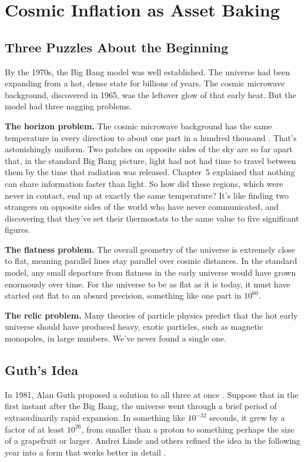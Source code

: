 \section{Cosmic Inflation as Asset Baking}

\subsection{Three Puzzles About the Beginning}

By the 1970s, the Big Bang model was well established. The universe had been expanding from a hot, dense state for billions of years. The cosmic microwave background, discovered in 1965, was the leftover glow of that early heat. But the model had three nagging problems.

\textbf{The horizon problem.} The cosmic microwave background has the same temperature in every direction to about one part in a hundred thousand \cite{smoot1992}. That's astonishingly uniform. Two patches on opposite sides of the sky are so far apart that, in the standard Big Bang picture, light had not had time to travel between them by the time that radiation was released. Chapter~5 explained that nothing can share information faster than light. So how did these regions, which were never in contact, end up at exactly the same temperature? It's like finding two strangers on opposite sides of the world who have never communicated, and discovering that they've set their thermostats to the same value to five significant figures.

\textbf{The flatness problem.} The overall geometry of the universe is extremely close to flat, meaning parallel lines stay parallel over cosmic distances. In the standard model, any small departure from flatness in the early universe would have grown enormously over time. For the universe to be as flat as it is today, it must have started out flat to an absurd precision, something like one part in \(10^{60}\).

\textbf{The relic problem.} Many theories of particle physics predict that the hot early universe should have produced heavy, exotic particles, such as magnetic monopoles, in large numbers. We've never found a single one.

\subsection{Guth's Idea}

In 1981, Alan Guth proposed a solution to all three at once \cite{guth1981}. Suppose that in the first instant after the Big Bang, the universe went through a brief period of extraordinarily rapid expansion. In something like \(10^{-32}\) seconds, it grew by a factor of at least \(10^{26}\), from smaller than a proton to something perhaps the size of a grapefruit or larger. Andrei Linde and others refined the idea in the following year into a form that works better in detail \cite{linde1982}.

